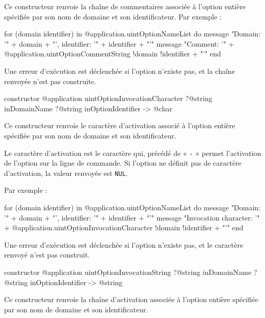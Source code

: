 Ce constructeur renvoie la chaîne de commentaires associée à l'option entière spécifiée par son nom de domaine et son identificateur. Par exemple :
\begin{galgas}
for (domain identifier) in @application.uintOptionNameList do
  message "Domain: '" + domain + "', identifier: '" + identifier + "'\n"
  message "Comment: '"
    + @application.uintOptionCommentString {!domain !identifier} + "'\n"
end
\end{galgas}

Une erreur d'exécution est déclenchée si l'option n'existe pas, et la chaîne renvoyée n'est pas construite.



\begin{galgasbox}
constructor @application uintOptionInvocationCharacter
    ?@string inDomainName
    ?@string inOptionIdentifier -> @char
\end{galgasbox}

Ce constructeur renvoie le caractère d'activation associé à l'option entière spécifiée par son nom de domaine et son identificateur.

Le caractère d'activation est le caractère qui, précédé de « \texttt{-} » permet l'activation de l'option sur la ligne de commande. Si l'option ne définit pas de caractère d'activation, la valeur renvoyée est \texttt{NUL}.

 Par exemple :
\begin{galgas}
for (domain identifier) in @application.uintOptionNameList do
  message "Domain: '" + domain + "', identifier: '" + identifier + "'\n"
  message "Invocation character: '"
    + @application.uintOptionInvocationCharacter {!domain !identifier} + "'\n"
end
\end{galgas}

Une erreur d'exécution est déclenchée si l'option n'existe pas, et le caractère renvoyé n'est pas construit.



\begin{galgasbox}
constructor @application uintOptionInvocationString
    ?@string inDomainName
    ?@string inOptionIdentifier -> @string
\end{galgasbox}

Ce constructeur renvoie la chaîne d'activation associée à l'option entière spécifiée par son nom de domaine et son identificateur.

